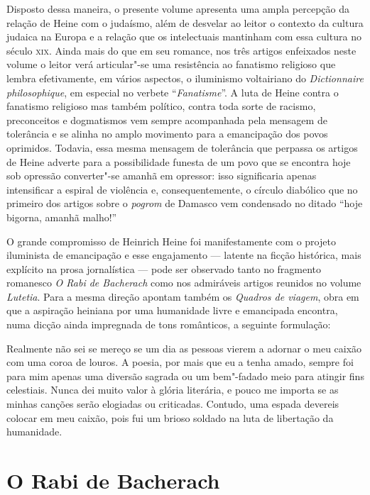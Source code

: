 Disposto dessa maneira, o presente volume apresenta uma ampla percepção da relação de Heine com o judaísmo, além de desvelar ao leitor o contexto da cultura judaica na Europa e a relação que os intelectuais mantinham com essa cultura no século \textsc{xix}.
Ainda mais do que em seu romance,
nos três artigos enfeixados neste volume o leitor verá articular"-se
uma resistência ao fanatismo religioso que lembra efetivamente, em
vários aspectos, o iluminismo voltairiano do \textit{Dictionnaire
philosophique}, em especial no verbete
“\textit{Fanatisme}”. A luta de Heine contra o fanatismo religioso mas
também político, contra toda sorte de racismo, preconceitos e
dogmatismos vem sempre acompanhada pela mensagem de tolerância e se
alinha no amplo movimento para a emancipação dos povos oprimidos.
Todavia, essa mesma mensagem de tolerância que perpassa os artigos de
Heine adverte para a possibilidade funesta de um povo que se encontra
hoje sob opressão converter"-se amanhã em opressor: isso significaria
apenas intensificar a espiral de violência e, consequentemente, o
círculo diabólico que no primeiro dos artigos sobre o \textit{pogrom}
de Damasco vem condensado no ditado “hoje bigorna, amanhã malho!”

 O grande compromisso de Heinrich Heine foi manifestamente com o projeto
iluminista de emancipação e esse engajamento --- latente na ficção
histórica, mais explícito na prosa jornalística --- pode ser observado
tanto no fragmento romanesco \textit{O Rabi de Bacherach} como nos
admiráveis artigos reunidos no volume \textit{Lutetia}. Para a mesma
direção apontam também os \textit{Quadros de viagem}, obra em que a
aspiração heiniana por uma humanidade livre e emancipada encontra, numa
dicção ainda impregnada de tons românticos, a seguinte formulação:

\begin{hedraquote}
Realmente não sei se mereço se um dia as pessoas vierem a adornar o
meu caixão com uma coroa de louros. A poesia, por mais que eu a tenha
amado, sempre foi para mim apenas uma diversão sagrada ou um
bem"-fadado meio para atingir fins celestiais. Nunca dei muito valor à
glória literária, e pouco me importa se as minhas canções serão
elogiadas ou criticadas. Contudo, uma espada devereis colocar em meu
caixão, pois fui um brioso soldado na luta de libertação da
humanidade.
\end{hedraquote}

\part{O Rabi de Bacherach}

